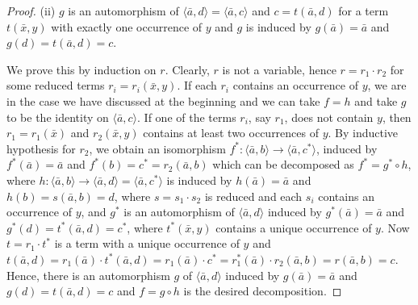 \documentclass[a4paper, 11pt]{article}
\theoremstyle{note}
\begin{document}
\begin{proof}
(ii) $g$ is an automorphism of  $\langle \bar{a},d\rangle =\langle\bar{a},c\rangle$ and  $c= t(\bar{a},d)$  for a term $t(\bar{x},y)$  with exactly one occurrence of $y$  and  $g$ is induced by $g(\bar{a})=\bar{a}$  and  $g(d)=t(\bar{a},d)= c$.

We prove this by induction on $r$. Clearly, $r$ is not a variable, hence $r=r_1\cdot r_2$  for some reduced terms $r_i= r_i(\bar{x},y)$.  If each $r_i$ contains an occurrence of $y$, we are in the case we have discussed at the beginning and we can take $f=h$ and take $g$ to be the identity on  $\langle \bar{a},c\rangle$. If one of the terms $r_i$, say $r_1$, does not contain $y$, then $r_1= r_1(\bar{x})$  and $r_2(\bar{x},y)$ contains at least two occurrences of $y$. By inductive hypothesis for $r_2$,   we obtain an isomorphism $f^\ast:\langle \bar{a},b\rangle\rightarrow \langle\bar{a},c^\ast\rangle$, induced by  $f^\ast(\bar{a})=\bar{a}$  and $f^\ast(b)=c^\ast= r_2(\bar{a},b)$ which can be decomposed as  $f^\ast = g^\ast\circ h$, where $h:\langle\bar{a},b\rangle \rightarrow \langle\bar{a},d\rangle =\langle \bar{a},c^\ast\rangle$ is induced by $h(\bar{a})=\bar{a}$ and  $h(b)= s(\bar{a},b)=d$, where $s =s_1\cdot s_2$ is reduced and each $s_i $  contains an occurrence of $y$,  and  $g^\ast$ is an automorphism of $\langle\bar{a},d\rangle$ induced by $g^\ast(\bar{a})=\bar{a}$  and  $g^\ast(d)=t^\ast(\bar{a},d)= c^\ast$, where $t^\ast(\bar{x},y)$  contains a unique occurrence of $y$. Now  $t= r_1\cdot t^\ast$  is a term with a unique occurrence of $y$  and  $t(\bar{a},d)= r_1(\bar{a})\cdot t^\ast(\bar{a},d)= r_1(\bar{a})\cdot c^\ast= r_1^\ast(\bar{a})\cdot r_2(\bar{a},b)= r(\bar{a},b)= c$. Hence, there is an automorphism $g$ of $\langle\bar{a},d\rangle$  induced by  $g(\bar{a})=\bar{a}$  and  $g(d)= t(\bar{a},d)= c$  and $f= g\circ h$  is the desired decomposition.
\end{proof}
\end{document}
